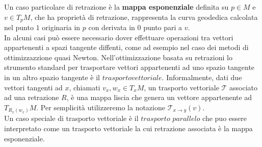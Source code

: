 \documentclass[a4paper, 12pt]{article}
\begin{document}
Un caso particolare di retrazione è la \textbf{mappa esponenziale} definita su $p \in M$ e $v \in T_pM$, che ha proprietà di retrazione, rappresenta la curva geodedica calcolata nel punto $1$ originaria in $p$ con derivata in $0$ punto pari a $v$.\\
In alcuni casi può essere necessario dover effettuare operazioni tra vettori appartenenti a spazi tangente diffenti, come ad esempio nel caso dei metodi di ottimizzazzione quasi Newton. Nell'ottimizzazione basata su retrazioni lo strumento standard per trasportare vettori appartenenti ad uno spazio tangente in un altro spazio tangente è il $trasporto vettoriale$. Informalmente, dati due vettori tangenti ad $x$, chiamati $v_x, w_x \in T_xM$, un trasporto vettoriale $\mathcal{T}$ associato ad una retrazione $R$, è una mappa liscia che genera un vettore appartenente ad $T_{R_x(w_x)}M$. Per semplicità utilizzeremo la notazione $\mathcal{T}_{x \to y}(v)$.\\
Un caso speciale di trasporto vettoriale è il $trasporto$ $parallelo$ che puo essere interpretato come un trasporto vettoriale la cui retrazione associata è la mappa esponenziale.
\end{document}
